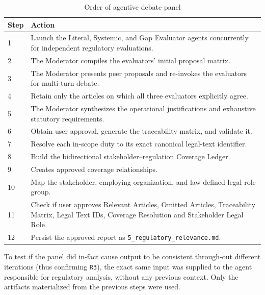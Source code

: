 \begin{table}[htbp]
\centering
\caption{Order of agentive debate panel}
\label{tab:PanelSteps}

\begin{tabular}{p{} p{}}
\hline
\textbf{Step} & \textbf{Action} \\
\hline
1 & Launch the Literal, Systemic, and Gap Evaluator agents concurrently for independent regulatory evaluations. \\

2 & The Moderator compiles the evaluators' initial proposal matrix. \\

3 & The Moderator presents peer proposals and re-invokes the evaluators for multi-turn debate. \\

4 & Retain only the articles on which all three evaluators explicitly agree. \\

5 & The Moderator synthesizes the operational justifications and exhaustive statutory requirements. \\

6 & Obtain user approval, generate the traceability matrix, and validate it. \\

7 & Resolve each in-scope duty to its exact canonical legal-text identifier. \\

8 & Build the bidirectional stakeholder--regulation Coverage Ledger. \\

9 & Creates approved coverage relationships. \\

10 & Map the stakeholder, employing organization, and law-defined legal-role group. \\

11 & Check if user approves Relevant Articles, Omitted Articles, Traceability Matrix, Legal Text IDs, Coverage Resolution and Stakeholder Legal Role \\

12 & Persist the approved report as \texttt{5\_regulatory\_relevance.md}. \\
\hline
\end{tabular}
\end{table}
\FloatBarrier

To test if the panel did in-fact cause output to be consistent through-out different iterations (thus confirming \texttt{R3}), the exact same input was supplied to the agent responsible for regulatory analysis, without any previous context. Only the artifacts materialized from the previous steps were used.

